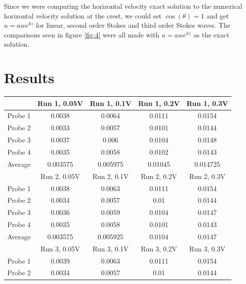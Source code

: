 \documentclass[english,a4paper,12pt]{article}
\begin{document}
Since we were comparing the horizontal velocity exact solution to the numerical horizontal velocity solution at the crest, we could set $\cos(\theta) = 1$ and get $u=awe^{kz}$ for linear, second order Stokes and third order Stokes waves. The comparisons seen in figure \ref{fig:4} were all made with $u = awe^{kz}$ as the exact solution.


\section*{Results}

\begin{table}[H]
    \centering
    \begin{tabular}{|c|c|c|c|c|} \hline
&       Run 1, 0.05V &       Run 1, 0.1V &  Run 1, 0.2V &     Run 1, 0.3V \\ \hline
Probe 1 &         0.0038  &  0.0064 &      0.0111 &         0.0154 \\ \hline
Probe 2 &         0.0033 &         0.0057 &         0.0101 &         0.0144 \\ \hline
Probe 3 &         0.0037 &         0.006 &  0.0104 &         0.0148 \\ \hline
Probe 4 &         0.0035 &         0.0058 &         0.0102 &         0.0143 \\ \hline \hline
Average &        0.003575 &       0.005975  &      0.01045 &        0.014725 \\ \hline \hline \hline
&        Run 2, 0.05V &       Run 2, 0.1V &        Run 2, 0.2V &        Run 2, 0.3V \\ \hline
Probe 1 &         0.0038 &         0.0063 &         0.0111 &         0.0154 \\ \hline
Probe 2 &         0.0034 &         0.0057 &         0.01 &   0.0144 \\ \hline
Probe 3 &         0.0036 &         0.0059 &         0.0104 &         0.0147 \\ \hline
Probe 4 &         0.0035 &         0.0058 &         0.0101 &         0.0143 \\ \hline \hline
Average &        0.003575 &       0.005925 &       0.0104 &         0.0147 \\ \hline \hline \hline
&       Run 3, 0.05V &       Run 3, 0.1V &        Run 3, 0.2V &        Run 3, 0.3V \\ \hline
Probe 1 &         0.0039 &         0.0063   &  0.0111 &      0.0154 \\ \hline
Probe 2 &         0.0034 &         0.0057   &  0.01 &        0.0144 \\ \hline

\end{tabular}
\end{table}
\end{document}
